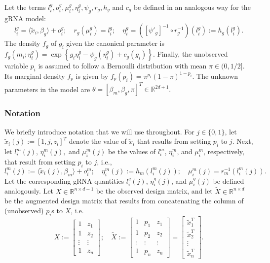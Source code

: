 \documentclass[12pt]{article}
\begin{document}
Let the terms $l^g_i, o^g_i, \mu^g_i, \eta^g_i, \psi_g, r_g, h_g$ and $c_g$ be defined in an analogous way for the gRNA model:
$$
l^g_i = \langle \tilde{x}_i, \beta_g \rangle + o^g_i; \quad
r_g(\mu^g_i) = l^g_i; \quad
\eta^g_i = \left([\psi'_g]^{-1} \circ r^{-1}_g\right)(l_i^g) := h_g(l_i^g).
$$
The density $f_g$ of $g_i$ given the canonical parameter is $f_g(m_i; \eta^g_i) = \exp\left\{g_i \eta^g_i - \psi_g(\eta^g_i) + c_g(g_i)\right\}.$
Finally, the unobserved variable $p_i$ is assumed to follow a Bernoulli distribution with mean $\pi \in (0, 1/2]$. Its marginal density $f_p$ is given by $f_p(p_i) = \pi^{p_i}(1-\pi)^{1 - p_i}.$
The unknown parameters in the model are
$\theta = [\beta_m, \beta_g, \pi]^{T}  \in \mathbb{R}^{2d + 1}.$

\subsubsection*{Notation}
We briefly introduce notation that we will use throughout. For $j \in \{0,1\}$, let $\tilde{x}_i(j) := [1, j, z_i]^T$ denote the value of $\tilde{x}_i$ that results from setting $p_i$ to $j$. Next, let  $l^m_i(j)$, $\eta^m_i(j),$ and $\mu^m_i(j)$ be the values of $l^m_i$, $\eta^m_i$, and $\mu^m_i$, respectively, that result from setting $p_i$ to $j$, i.e.,
$$
l^m_i(j) := \langle \tilde{x}_i(j), \beta_m \rangle + o^m_i; \quad \eta^m_i(j) := h_m(l^m_i(j)); \quad
\mu_i^m(j) = r_m^{-1}(l^m_i(j)).
$$
Let the corresponding gRNA quantities $l^g_i(j)$, $\eta_i^g(j)$, and $\mu^g_i(j)$ be defined analogously. Let $X \in \mathbb{R}^{n \times {d-1}}$ be the observed design matrix, and let $\tilde{X} \in \mathbb{R}^{n \times d}$ be the augmented design matrix that results from concatenating the column of (unobserved) $p_i$s to $X$, i.e.
$$X := \begin{bmatrix} 
1 & z_1 \\
1 & z_2 \\
\vdots & \vdots \\
1 & z_n
\end{bmatrix}; \quad 
\tilde{X}  := 
\begin{bmatrix}
1 & p_1 & z_1 \\
1 & p_2 & z_2 \\ 
\vdots & \vdots & \vdots \\
1 & p_n & z_n
\end{bmatrix} = \begin{bmatrix}
\tilde{x}_1^T \\ \tilde{x}_2^T \\ \vdots \\ \tilde{x}_n^T
\end{bmatrix}.
$$ 
\end{document}
